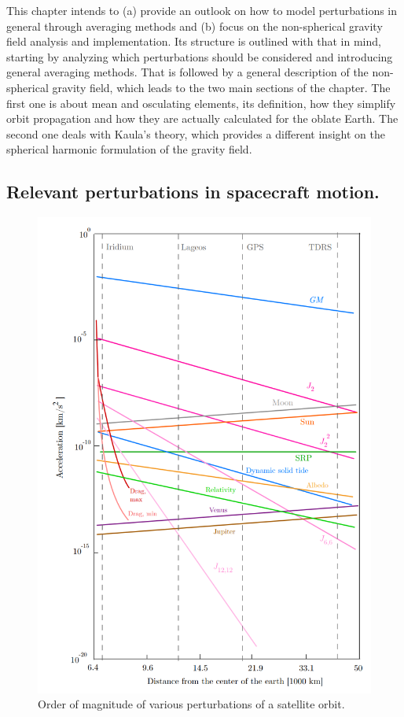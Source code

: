 %
\indent This chapter intends to (a) provide an outlook on how to model perturbations in general through averaging methods and (b) focus on the non-spherical gravity field analysis and implementation. Its structure is outlined with that in mind, starting by analyzing which perturbations should be considered and introducing general averaging methods. That is followed by a general description of the non-spherical gravity field, which leads to the two main sections of the chapter. The first one is about mean and osculating elements, its definition, how they simplify orbit propagation and how they are actually calculated for the oblate Earth. The second one deals with Kaula's theory, which provides a different insight on the spherical harmonic formulation of the gravity field.
%
	\subsection{Relevant perturbations in spacecraft motion.}
	\indent 
	\begin{figure}[!htb]
	\centering\includegraphics[width = 0.8\linewidth]{Chapters/Chapter_04/Pert_montenbruck}
	\caption{Order of magnitude of various perturbations of a satellite orbit. \cite{Montenbruck}}
	\label{figCh4:Pert_montenbruck}
	\end{figure}
	\FloatBarrier
